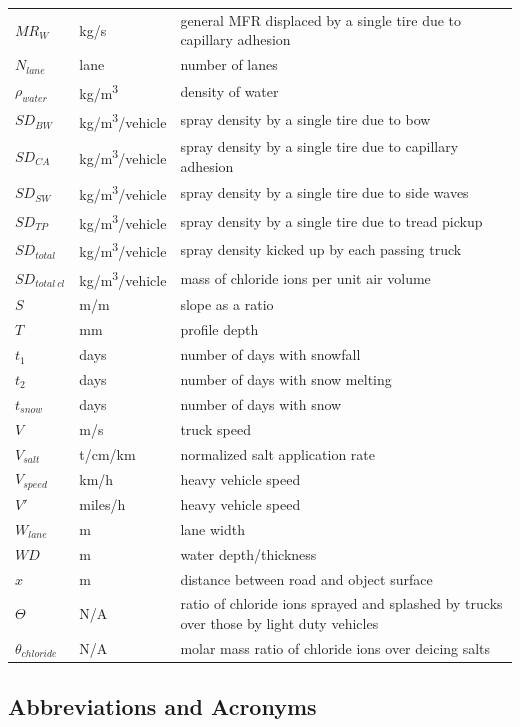\documentclass[12pt]{article}
\begin{document}
\begin{longtable*}{l l p{12cm}}
$\mathit{MR_{W}}$ & \si{kg/s} & general MFR displaced by a single tire due to capillary adhesion\\
$N_{lane}$ & lane & number of lanes\\
$\rho_{water}$ & \si{kg/m^{3}} & density of water\\
$\mathit{SD_{BW}}$ & \si{kg/m^{3}/vehicle} & spray density by a single tire due to bow\\
$\mathit{SD_{CA}}$ & \si{kg/m^{3}/vehicle} & spray density by a single tire due to capillary adhesion\\
$\mathit{SD_{SW}}$ & \si{kg/m^{3}/vehicle} & spray density by a single tire due to side waves\\
$\mathit{SD_{TP}}$ & \si{kg/m^{3}/vehicle} & spray density by a single tire due to tread pickup\\
$\mathit{SD_{total}}$ & \si{kg/m^{3}/vehicle} & spray density kicked up by each passing truck\\
$\mathit{SD_{total~cl}}$ & \si{kg/m^3/vehicle} & mass of chloride ions per unit air volume\\
$S$ & \si{m/m} & slope as a ratio\\
$T$ & \si{mm} & profile depth\\
$t_1$ & days & number of days with snowfall\\
$t_2$ & days & number of days with snow melting\\
$t_{snow}$ & days & number of days with snow\\
$V$ & \si{m/s} & truck speed\\
$V_{salt}$ & \si{t/cm/km} & normalized salt application rate\\
$V_{speed}$ & \si{km/h} & heavy vehicle speed\\
$V'$ & \si{miles/h} & heavy vehicle speed\\
$W_{lane}$ & \si{m} & lane width\\
$\mathit{WD}$ & \si{m} & water depth/thickness\\
$x$ & \si{m} & distance between road and object surface\\
$\Theta$ & N/A & ratio of chloride ions sprayed and splashed by trucks over those by light duty vehicles\\
$\theta_{chloride}$ & N/A & molar mass ratio of chloride ions over deicing salts\\
\bottomrule
\end{longtable*}
\subsection{Abbreviations and Acronyms}
\end{document}
